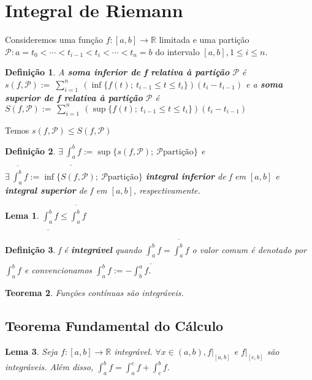 \documentclass[12pt]{article}
\newtheorem{theorem}{Teorema}[section]
\newtheorem{lemma}[theorem]{Lema}
\newtheorem{definition}{Definição}
\begin{document}
\section{Integral de Riemann}
Consideremos uma função $f: [a, b] \rightarrow{} \mathbb{R}$ limitada e uma partição $\mathcal{P}: a = t_0 < \cdots < t_{i-1} < t_i < \cdots < t_n = b$ do intervalo $[a, b], 1 \leq i \leq n$.

\begin{definition}
    A \textbf{soma inferior de f relativa à partição} $\mathcal{P}$ é $s(f, \mathcal{P}) :=\ \sum_{i = 1}^n\ (\inf \{ f(t);\ t_{i-1} \leq t \leq t_i \}) (t_i - t_{i-1})$ e a \textbf{soma superior de f relativa à partição} $\mathcal{P}$ é $S(f, \mathcal{P}) :=\ \sum_{i = 1}^n\ (\sup \{ f(t);\ t_{i-1} \leq t \leq t_i \}) (t_i - t_{i-1})$
\end{definition}

Temos $s(f, \mathcal{P}) \leq S(f, \mathcal{P})$

\begin{definition}
    $\exists \ \underline{\int_{a}^b} f := \sup \{s(f, \mathcal{P}) ;\ \mathcal{P} \text{partição} \}$ e $\exists \ \overline{\int_{a}^b} f := \inf \{S(f, \mathcal{P}) ;\ \mathcal{P} \text{partição} \}$ \textbf{integral inferior} de f em $[a, b]$ e \textbf{integral superior} de f em $[a, b]$, respectivamente.
\end{definition}

\begin{lemma}
    $\underline{\int_{a}^b} f \leq \overline{\int_{a}^b} f$
\end{lemma}

\begin{definition}
    f é \textbf{integrável} quando $\underline{\int_{a}^b} f = \overline{\int_{a}^b} f$ o valor comum é denotado por $\int_a^b f$ e convencionamos $\int_a^b f := - \int_b^a f$.
\end{definition}

\begin{theorem}
    Funções contínuas são integráveis.
\end{theorem}

\subsection{Teorema Fundamental do Cálculo}
\begin{lemma}
    Seja $f: [a, b] \rightarrow{} \mathbb{R}$ integrável. $\forall x \in (a, b), f|_{[a, b]}$ e $f|_{[c, b]}$ são integráveis. Além disso, $\int_a^b f = \int_a^c f + \int_c^b f$.
\end{lemma}
\end{document}
